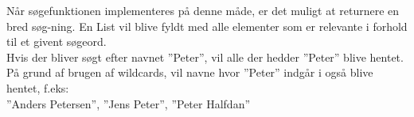 Når søgefunktionen implementeres på denne måde, er det muligt at returnere en bred søg-ning. En List vil blive fyldt med alle elementer som er relevante i forhold til et givent søgeord.\\
Hvis der bliver søgt efter navnet ”Peter”, vil alle der hedder ”Peter” blive hentet. På grund af brugen af wildcards, vil navne hvor ”Peter” indgår i også blive hentet, f.eks:\\
”Anders Petersen”, ”Jens Peter”, ”Peter Halfdan”\\